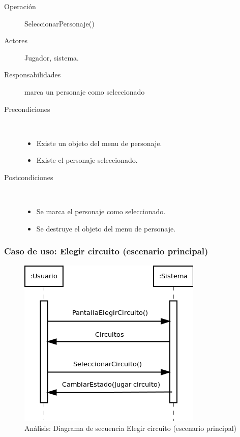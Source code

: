 \begin{description}
    \item [Operación] SeleccionarPersonaje()
    \item [Actores] Jugador, sistema.
    \item [Responsabilidades] marca un personaje como seleccionado
    \item [Precondiciones] $\quad$
        \begin{itemize}
            \item Existe un objeto del menu de personaje.
            \item Existe el personaje seleccionado.
        \end{itemize}
    \item [Postcondiciones] $\quad$
        \begin{itemize}
            \item Se marca el personaje como seleccionado.
            \item Se destruye el objeto del menu de personaje.
        \end{itemize}
\end{description}

\subsubsection{Caso de uso: Elegir circuito (escenario principal)}

\begin{figure}[H] 
  \label{secuencia_elegir_circuito}
  \begin{center}
    \includegraphics[scale=0.6]{imagenes/analisis/secuencia_elegir_circuito.png}
  \end{center}
  \caption{Análisis: Diagrama de secuencia Elegir circuito (escenario principal)}
\end{figure}


